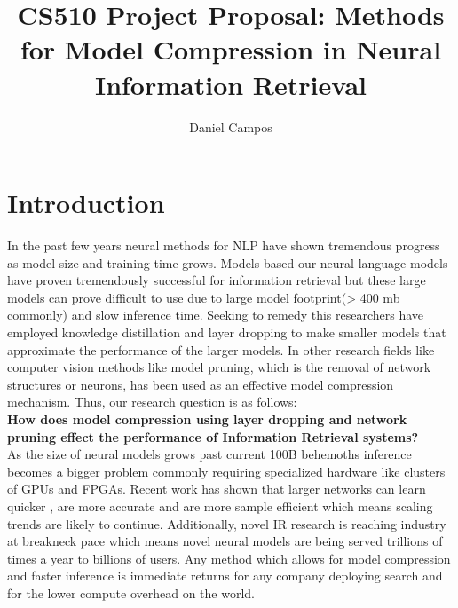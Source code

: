 \documentclass[sigplan,screen]{acmart}
\begin{document}
\title{CS510 Project Proposal: Methods for Model Compression in Neural Information Retrieval}
\author{Daniel Campos}
\maketitle
\section{Introduction}
In the past few years neural methods for NLP have shown tremendous progress as model size and training time grows. Models based our neural language models have proven tremendously successful for information retrieval but these large models can prove difficult to use due to large model footprint(> 400 mb commonly) and slow inference time. Seeking to remedy this researchers have employed knowledge distillation and layer dropping to make smaller models that approximate the performance of the larger models. In other research fields like computer vision methods like model pruning, which is the removal of network structures or neurons, has been used as an effective model compression mechanism. Thus, our research question is as follows: \\
\textbf{How does model compression using layer dropping and network pruning effect the performance of Information Retrieval systems?} \\
As the size of neural models grows past current 100B behemoths \cite{Brown2020LanguageMA} inference becomes a bigger problem commonly requiring specialized hardware like clusters of GPUs and FPGAs. Recent work has shown that larger networks can learn quicker \cite{Li2020TrainLT}, are more accurate and are more sample efficient \cite{Kaplan2020ScalingLF} which means scaling trends are likely to continue. Additionally, novel IR research is reaching industry at breakneck pace which means novel neural models are being served trillions of times a year to billions of users. Any method which allows for model compression and faster inference is immediate returns for any company deploying search and for the lower compute overhead on the world.
\end{document}
